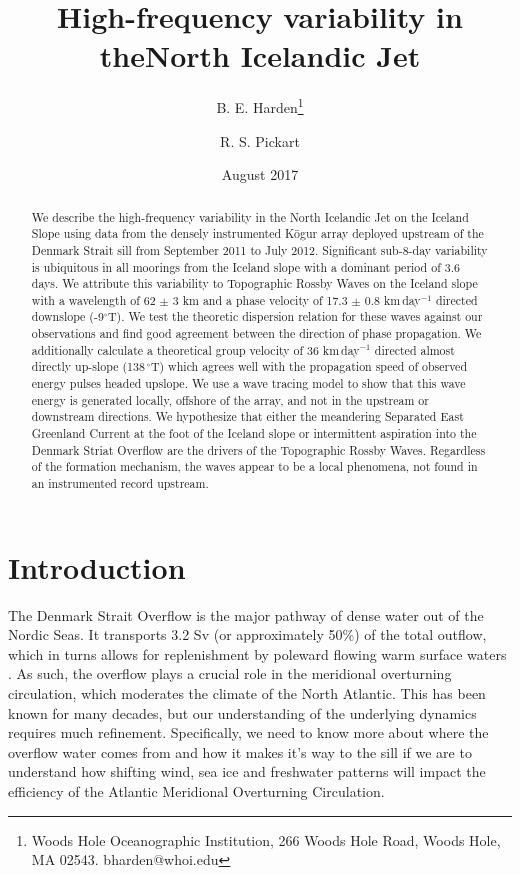 \documentclass[12pt,titlepage,figuresatend]{article}
\title{High-frequency variability in the\authorcr North Icelandic Jet}
\author{B. E. Harden\footnote{Woods Hole Oceanographic Institution, 266 Woods Hole Road, Woods Hole, MA 02543. bharden@whoi.edu}}
\author{R. S. Pickart}
\affil{Woods Hole Oceanographic Institution, Woods Hole, USA}
\date{August 2017}
\begin{document}
\maketitle

\begin{abstract}
We describe the high-frequency variability in the North Icelandic Jet on the Iceland Slope using data from the densely instrumented K\"{o}gur array deployed upstream of the Denmark Strait sill from September 2011 to July 2012. Significant sub-8-day variability is ubiquitous in all moorings from the Iceland slope with a dominant period of 3.6 days. We attribute this variability to Topographic Rossby Waves on the Iceland slope with a wavelength of 62 $\pm$ 3 km and a phase velocity of 17.3 $\pm$ 0.8 km$\,$day$^{-1}$ directed downslope (-9$^{\circ}$T). We test the theoretic dispersion relation for these waves against our observations and find good agreement between the direction of phase propagation. We additionally calculate a theoretical group velocity of 36 km$\,$day$^{-1}$ directed almost directly up-slope (138$\,^{\circ}$T) which agrees well with the propagation speed of observed energy pulses headed upslope. We use a wave tracing model to show that this wave energy is generated locally, offshore of the array, and not in the upstream or downstream directions. We hypothesize that either the meandering Separated East Greenland Current at the foot of the Iceland slope or intermittent aspiration into the Denmark Striat Overflow are the drivers of the Topographic Rossby Waves. Regardless of the formation mechanism, the waves appear to be a local phenomena, not found in an instrumented record upstream.

\end{abstract}

\section{Introduction}

The Denmark Strait Overflow is the major pathway of dense water out of the Nordic Seas. It transports 3.2 Sv (or approximately 50\%) of the total outflow, which in turns allows for replenishment by poleward flowing warm surface waters \cite[]{Dickson1994,Jochumsen2017}. As such, the overflow plays a crucial role in the meridional overturning circulation, which moderates the climate of the North Atlantic. This has been known for many decades, but our understanding of the underlying dynamics requires much refinement.  Specifically, we need to know more about where the overflow water comes from and how it makes it’s way to the sill if we are to understand how shifting wind, sea ice and freshwater patterns will impact the efficiency of the Atlantic Meridional Overturning Circulation.
\end{document}
